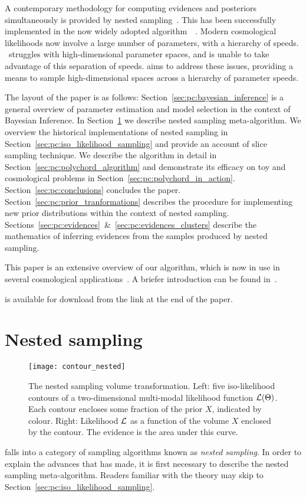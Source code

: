 A contemporary methodology for computing evidences and posteriors simultaneously is provided by nested sampling~\citep{skilling2006}. This has been successfully implemented in the now widely adopted algorithm \MultiNest\,~\citep{MultiNest1,MultiNest2,MultiNest3}.  Modern cosmological likelihoods now involve a large number of parameters, with a hierarchy of speeds.  \MultiNest\ struggles with high-dimensional parameter spaces, and is unable to take advantage of this separation of speeds.  \PolyChord{} aims to address these issues, providing a means to sample high-dimensional spaces across a hierarchy of parameter speeds.

The layout of the paper is as follows:
Section~\ref{sec:pc:bayesian_inference} is a general overview of parameter estimation and model selection in the context of Bayesian Inference.
In Section~\ref{sec:pc:nested_sampling} we describe  nested sampling meta-algorithm.
We overview the historical implementations of nested sampling in Section~\ref{sec:pc:iso_likelihood_sampling} and provide an account of  slice sampling technique.
We describe the \PolyChord{} algorithm in detail in Section~\ref{sec:pc:polychord_algorithm} and demonstrate its efficacy on toy and cosmological problems in Section~\ref{sec:pc:polychord_in_action}.  
Section~\ref{sec:pc:conclusions} concludes the paper.
Section~\ref{sec:pc:prior_tranformations} describes the procedure for implementing new prior distributions within the context of nested sampling.
Sections~\ref{sec:pc:evidences}~\&~\ref{sec:pc:evidences_clusters} describe the mathematics of inferring evidences from the samples produced by nested sampling.

This paper is an extensive overview of our algorithm, which is now in use in several cosmological applications~\citep{planck2015-a24}. A briefer introduction can be found in~\cite{polychordletter}.

\PolyChord{} is available for download from the link at the end of the paper.

\section{Nested sampling}
\label{sec:pc:nested_sampling}
%
\begin{figure}
  \centering
  \texttt{[image: contour\_nested]}
  \caption{%
    The nested sampling volume transformation.
    Left: five iso-likelihood contours of a two-dimensional multi-modal likelihood function $\mathcal{L}(\Theta)$. Each contour encloses some fraction of the prior $X$, indicated by colour.
    Right: Likelihood $\mathcal{L}$ as a function of the volume $X$ enclosed by the contour. The evidence is the area under this curve.\label{fig:pc:prior_volume}
  }
\end{figure}
%
\PolyChord{} falls into a category of sampling algorithms known as {\em nested sampling}. In order to explain the advances that \PolyChord{} has made, it is first necessary to describe the nested sampling meta-algorithm. Readers familiar with the theory may skip to Section~\ref{sec:pc:iso_likelihood_sampling}.


